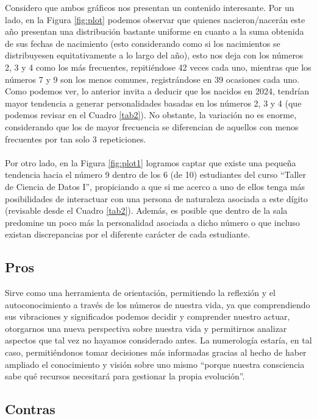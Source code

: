 \documentclass{article}
\begin{document}
	Considero que ambos gráficos nos presentan un contenido interesante. Por un lado, en la Figura \ref{fig:plot} podemos observar que quienes nacieron/nacerán este año presentan una distribución bastante uniforme en cuanto a la suma obtenida de sus fechas de nacimiento (esto considerando como si los nacimientos se distribuyesen equitativamente a lo largo del año), esto nos deja con los números 2, 3 y 4 como los más frecuentes, repitiéndose 42 veces cada uno,  mientras que los números 7 y 9 son los menos comunes, registrándose en 39 ocasiones cada uno. Como podemos ver, lo anterior invita a deducir que los nacidos en 2024, tendrían mayor tendencia a generar personalidades basadas en los números 2, 3 y 4 (que podemos revisar en el Cuadro \ref{tab2}). No obstante, la variación no es enorme, considerando que los de mayor frecuencia se diferencian de aquellos con menos frecuentes por tan solo 3 repeticiones.\\\\
	Por otro lado, en la Figura \ref{fig:plot1} logramos captar que existe una pequeña tendencia hacia el número 9 dentro de los 6 (de 10) estudiantes del curso “Taller de Ciencia de Datos I”, propiciando a que si me acerco a uno de ellos tenga más posibilidades de interactuar con una persona de naturaleza asociada a este dígito (revisable desde el Cuadro \ref{tab2}). Además, es posible que dentro de la sala predomine un poco más la personalidad asociada a dicho número o que incluso existan discrepancias por el diferente carácter de cada estudiante.
	
	\subsection*{Pros}
	
	Sirve como una herramienta de orientación, permitiendo la reflexión y el autoconocimiento a través de los números de nuestra vida, ya que comprendiendo sus vibraciones y significados podemos decidir y comprender nuestro actuar, otorgarnos una nueva perspectiva sobre nuestra vida y permitirnos analizar aspectos que tal vez no hayamos considerado antes. La numerología estaría, en tal caso, permitiéndonos tomar decisiones más informadas gracias al hecho de haber ampliado el conocimiento y visión sobre uno mismo “porque nuestra consciencia sabe qué recursos necesitará para gestionar la propia evolución”.\cite{rutenberg}
	
	\subsection*{Contras}
	
\end{document}
